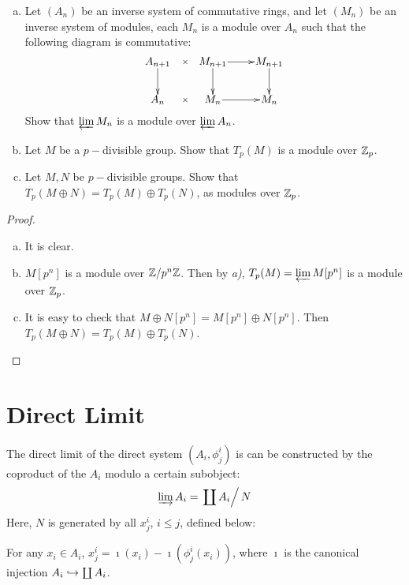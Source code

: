   \begin{ex}
    \begin{enumerate}[a)]
      \item Let $(A_n)$ be an inverse system of commutative rings, and let $(M_n)$ be an inverse system of modules, each $M_n$ is a module over $A_n$ such that the following diagram is commutative:
          \begin{displaymath}
            \xymatrix@1{
               A_{n+1}\ar@{}[r]|{\times}\ar[d] & M_{n+1}\ar[r]\ar[d] & M_{n+1}\ar[d] \\
               A_n\ar@{}[r]|{\times} & M_n\ar[r] & M_n                 }
          \end{displaymath}
          Show that $\operatorname*{\underleftarrow{\lim}} M_n$ is a module over $\operatorname*{\underleftarrow{\lim}} A_n$.
      \item Let $M$ be a $p-$divisible group. Show that $T_p(M)$ is a module over ${\mathbb Z}_p$.
      \item Let $M,N$ be $p-$divisible groups. Show that $T_p(M\oplus N) = T_p(M) \oplus T_p(N)$, as modules over ${\mathbb Z}_p$.
    \end{enumerate}
  \end{ex}
  \begin{proof}
    \begin{enumerate}[a)]
      \item It is clear.
      \item $M[p^n]$ is a module over ${\mathbb Z}/p^n{\mathbb Z}$. Then by \emph{a)}, $T_p(M)=\operatorname*{\underleftarrow{\lim}} M[p^n]$ is a module over ${\mathbb Z}_p$.
      \item It is easy to check that $M \oplus N [p^n] = M[p^n] \oplus N[p^n]$. Then $T_p(M\oplus N) = T_p(M) \oplus T_p(N)$.
    \end{enumerate}
  \end{proof}

\newpage\section{Direct Limit}

  The direct limit of the direct system $(A_i,\phi^i_j)$ is can be constructed by the coproduct of the $A_i$ modulo a certain subobject:
  \begin{equation*}
    \operatorname*{\underrightarrow{\lim}} A_i = \left.\coprod A_i \right/N
  \end{equation*}
  Here, $N$ is generated by all $x^i_j$, $i\leqslant j$, defined below:

  For any $x_i\in A_i$, $x^i_j=\imath(x_i)-\imath(\phi^i_j(x_i))$, where $\imath$ is the canonical injection $A_i\hookrightarrow \coprod A_i$.

